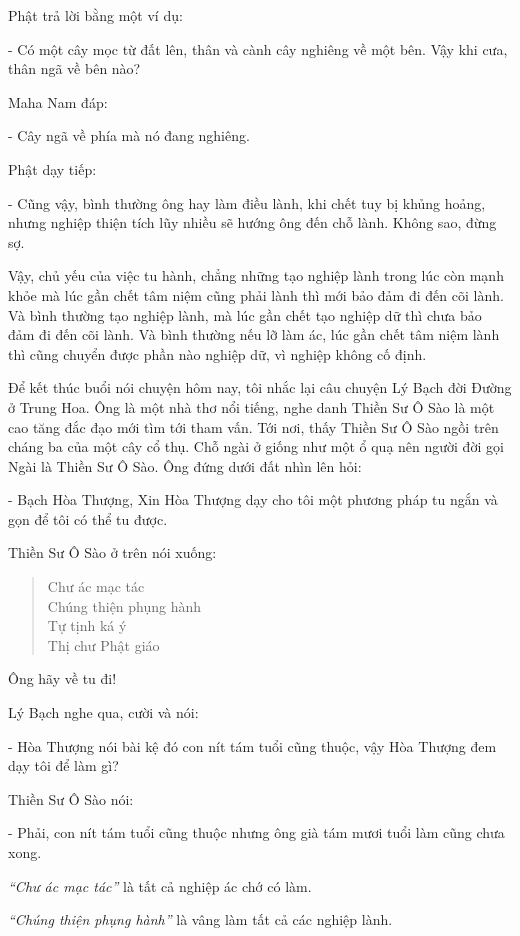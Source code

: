 \documentclass[
  12pt,
  oneside]{book}
\begin{document}
Phật trả lời bằng một ví dụ:

- Có một cây mọc từ đất lên, thân và cành cây nghiêng về một bên. Vậy khi cưa, thân ngã về bên nào?

Maha Nam đáp:

- Cây ngã về phía mà nó đang nghiêng.

Phật dạy tiếp:

- Cũng vậy, bình thường ông hay làm điều lành, khi chết tuy bị khủng hoảng, nhưng nghiệp thiện tích lũy nhiều sẽ hướng ông đến chỗ lành. Không sao, đừng sợ.

Vậy, chủ yếu của việc tu hành, chẳng những tạo nghiệp lành trong lúc còn mạnh khỏe mà lúc gần chết tâm niệm cũng phải lành thì mới bảo đảm đi đến cõi lành. Và bình thường tạo nghiệp lành, mà lúc gần chết tạo nghiệp dữ thì chưa bảo đảm đi đến cõi lành. Và bình thường nếu lỡ làm ác, lúc gần chết tâm niệm lành thì cũng chuyển được phần nào nghiệp dữ, vì nghiệp không cố định.

Để kết thúc buổi nói chuyện hôm nay, tôi nhắc lại câu chuyện Lý Bạch đời Đường ở Trung Hoa. Ông là một nhà thơ nổi tiếng, nghe danh Thiền Sư Ô Sào là một cao tăng đắc đạo mới tìm tới tham vấn. Tới nơi, thấy Thiền Sư Ô Sào ngồi trên cháng ba của một cây cổ thụ. Chỗ ngài ở giống như một ổ quạ nên người đời gọi Ngài là Thiền Sư Ô Sào. Ông đứng dưới đất nhìn lên hỏi:

- Bạch Hòa Thượng, Xin Hòa Thượng dạy cho tôi một phương pháp tu ngắn và gọn để tôi có thể tu được.

Thiền Sư Ô Sào ở trên nói xuống:

\begin{quote}
Chư ác mạc tác\\
Chúng thiện phụng hành\\
Tự tịnh ká ý\\
Thị chư Phật giáo
\end{quote}

Ông hãy về tu đi!

Lý Bạch nghe qua, cười và nói:

- Hòa Thượng nói bài kệ đó con nít tám tuổi cũng thuộc, vậy Hòa Thượng đem dạy tôi để làm gì?

Thiền Sư Ô Sào nói:

- Phải, con nít tám tuổi cũng thuộc nhưng ông già tám mươi tuổi làm cũng chưa xong.

\emph{``Chư ác mạc tác''} là tất cả nghiệp ác chớ có làm.

\emph{``Chúng thiện phụng hành''} là vâng làm tất cả các nghiệp lành.
\end{document}
